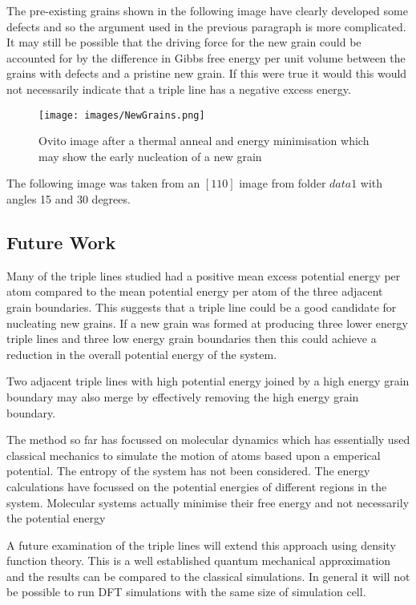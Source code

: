 \documentclass[12pt,a4paper]{book}
\begin{document}
The pre-existing grains shown in the following image have clearly developed some defects and so the argument used in the previous paragraph is more complicated. It may still be possible that the driving force for the new grain could be accounted for by the difference in Gibbs free energy per unit volume between the grains with defects and a pristine new grain. If this were true it would this would not necessarily indicate that a triple line has a negative excess energy.

\begin{figure}
	\centering
	\texttt{[image: images/NewGrains.png]} 
	\label{fig:NewGrains}
	\caption{Ovito image after a thermal anneal and energy minimisation which may show the early nucleation of a new grain}
\end{figure}

The following image was taken from an $[1 1 0]$ image from folder $data1$ with angles 15 and 30 degrees.


\subsection{Future Work}


Many of the triple lines studied had a positive mean excess potential energy per atom compared to the mean potential energy per atom of the three adjacent grain boundaries. This suggests that a triple line could be a good candidate for nucleating new grains. If a new grain was formed at producing three lower energy triple lines and three low energy grain boundaries then this could achieve a reduction in the overall potential energy of the system.

Two adjacent triple lines with high potential energy joined by a high energy grain boundary may also merge by effectively removing the high energy grain boundary. 


The method so far has focussed on molecular dynamics which has essentially used classical mechanics to simulate the motion of atoms based upon a emperical potential. The entropy of the system has not been considered. The energy calculations have focussed on the potential energies of different regions in the system. Molecular systems actually minimise their free energy and not necessarily the potential energy 

A future examination of the triple lines will extend this approach using density function theory. This is a well established quantum mechanical approximation and the results can be compared to the classical simulations. In general it will not be possible to run DFT simulations with the same size of simulation cell.  

 
\end{document}
